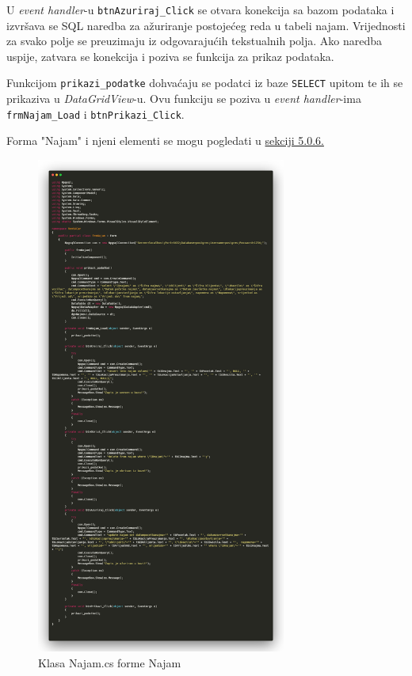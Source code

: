 \documentclass[]{foi} %
\begin{document}
U \textit{event handler}-u \texttt{btnAzuriraj\_Click} se otvara konekcija sa bazom podataka i izvršava se SQL naredba za ažuriranje postojećeg reda u tabeli najam. Vrijednosti za svako polje se preuzimaju iz odgovarajućih tekstualnih polja. Ako naredba uspije, zatvara se konekcija i poziva se funkcija za prikaz podataka.

Funkcijom \texttt{prikazi\_podatke} dohvaćaju se podatci iz baze \texttt{SELECT} upitom te ih se prikaziva u \textit{DataGridView}-u. Ovu funkciju se poziva u \textit{event handler}-ima \texttt{frmNajam\_Load} i \texttt{btnPrikazi\_Click}.

Forma "Najam" i njeni elementi se mogu pogledati u \hyperref[sec:najam]{sekciji 5.0.6.}
\newpage

\begin{figure}[!ht]
    \centering
    \includegraphics[width=0.73\textwidth]{slike/klasa.png}
    \caption{Klasa Najam.cs forme Najam}
    \label{fig:klasa}
\end{figure}
\newpage
\end{document}
